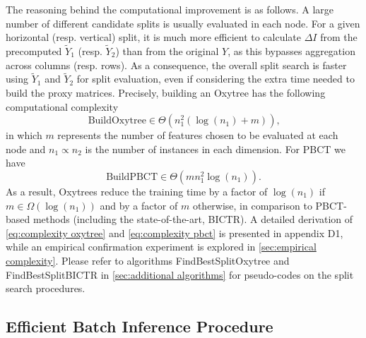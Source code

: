 \documentclass[letterpaper]{article}
\begin{document}
The reasoning behind the computational improvement is as follows. A large number of different candidate splits is usually evaluated in each node. For a given horizontal (resp. vertical) split, it is much more efficient to calculate $\Delta I$ from the precomputed $\tilde Y_1$ (resp. $\tilde Y_2$) than from the original $Y$, as this bypasses aggregation across columns (resp. rows).
As a consequence, the overall split search is faster using $\tilde Y_1$ and $\tilde Y_2$ for split evaluation, even if considering the extra time needed to build the proxy matrices.
%
Precisely, building an Oxytree has
the following computational complexity
\begin{equation}
    \label{eq:complexity oxytree}
    \text{BuildOxytree} \in \Theta(n_1^2 (\log (n_1) + m))
    \text{,}
\end{equation}
%
in which $m$ represents the number of features chosen to be evaluated at each node and $n_1 \propto n_2$ is the number of instances in each dimension. For PBCT we have
\begin{equation}
    \label{eq:complexity pbct}
    \text{BuildPBCT} \in \Theta(m n_1^2 \log (n_1))
    \text{.}
\end{equation}
As a result, Oxytrees reduce the training time by a factor of $\log (n_1)$  if $m \in \Omega(\log (n_1))$ and by a factor of $m$ otherwise, in comparison to PBCT-based methods (including the state-of-the-art, BICTR). A detailed derivation of \cref{eq:complexity oxytree} and \cref{eq:complexity pbct} is presented in
appendix D1,
while an empirical confirmation experiment is explored in \cref{sec:empirical complexity}.
Please refer to algorithms
FindBestSplitOxytree and FindBestSplitBICTR
in \cref{sec:additional algorithms}
for pseudo-codes on the split search procedures.


\subsection{Efficient Batch Inference Procedure}
\label{sec:batch inference}

\end{document}
